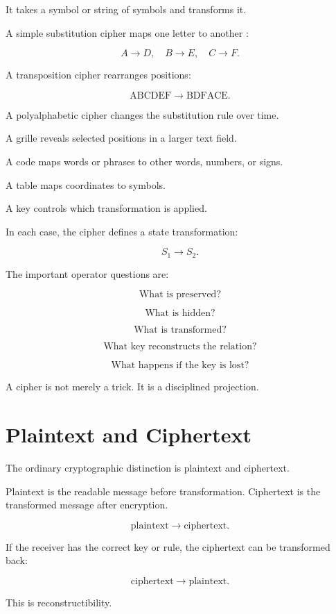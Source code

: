 \documentclass[11pt]{book}
\begin{document}
It takes a symbol or string of symbols and transforms it.

A simple substitution cipher maps one letter to another \cite{Kahn1996Codebreakers,Singh1999CodeBook}:

\[
A \rightarrow D,
\quad
B \rightarrow E,
\quad
C \rightarrow F.
\]

A transposition cipher rearranges positions:

\[
\text{ABCDEF} \rightarrow \text{BDFACE}.
\]

A polyalphabetic cipher changes the substitution rule over time.

A grille reveals selected positions in a larger text field.

A code maps words or phrases to other words, numbers, or signs.

A table maps coordinates to symbols.

A key controls which transformation is applied.

In each case, the cipher defines a state transformation:

\[
S_1 \rightarrow S_2.
\]

The important operator questions are:

\[
\text{What is preserved?}
\]

\[
\text{What is hidden?}
\]

\[
\text{What is transformed?}
\]

\[
\text{What key reconstructs the relation?}
\]

\[
\text{What happens if the key is lost?}
\]

A cipher is not merely a trick. It is a disciplined projection.

\section{Plaintext and Ciphertext}

The ordinary cryptographic distinction is plaintext and ciphertext.

Plaintext is the readable message before transformation. Ciphertext is the transformed message after encryption.

\[
\text{plaintext} \rightarrow \text{ciphertext}.
\]

If the receiver has the correct key or rule, the ciphertext can be transformed back:

\[
\text{ciphertext} \rightarrow \text{plaintext}.
\]

This is reconstructibility.
\end{document}
